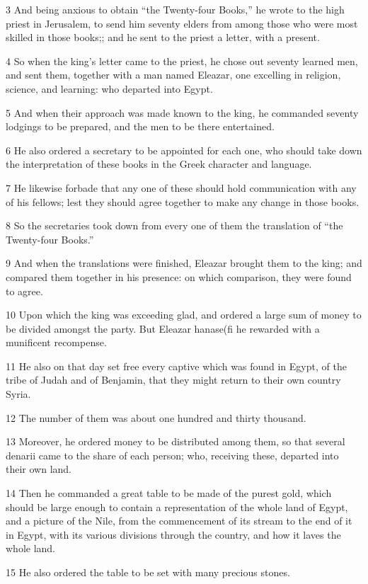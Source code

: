 3 And being anxious to obtain “the Twenty-four Books,” he wrote to the high priest in Jerusalem, to send him seventy elders from among those who were most skilled in those books;; and he sent to the priest a letter, with a present. 

4 So when the king’s letter came to the priest, he chose out seventy learned men, and sent them, together with a man named Eleazar, one excelling in religion, science, and learning: who departed into Egypt. 

5 And when their approach was made known to the king, he commanded seventy lodgings to be prepared, and the men to be there entertained. 

6 He also ordered a secretary to be appointed for each one, who should take down the interpretation of these books in the Greek character and language. 

7 He likewise forbade that any one of these should hold communication with any of his fellows; lest they should agree together to make any change in those books. 

8 So the secretaries took down from every one of them the translation of “the Twenty-four Books.” 

9 And when the translations were finished, Eleazar brought them to the king; and compared them together in his presence: on which comparison, they were found to agree. 

10 Upon which the king was exceeding glad, and ordered a large sum of money to be divided amongst the party. But Eleazar hanase(fi he rewarded with a munificent recompense. 

11 He also on that day set free every captive which was found in Egypt, of the tribe of Judah and of Benjamin, that they might return to their own country Syria. 

12 The number of them was about one hundred and thirty thousand. 

13 Moreover, he ordered money to be distributed among them, so that several denarii came to the share of each person; who, receiving these, departed into their own land. 

14 Then he commanded a great table to be made of the purest gold, which should be large enough to contain a representation of the whole land of Egypt, and a picture of the Nile, from the commencement of its stream to the end of it in Egypt, with its various divisions through the country, and how it laves the whole land. 

15 He also ordered the table to be set with many precious stones. 

